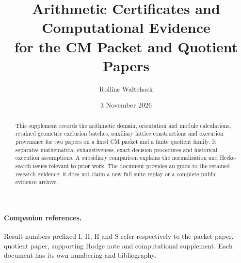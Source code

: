 \documentclass[11pt]{article}
\title{Arithmetic Certificates and Computational Evidence\\for the CM Packet and Quotient Papers}
\author{Rollins Waltchack}
\date{3 November 2026}
\begin{document}
\maketitle
\begin{abstract}
This supplement records the arithmetic domain, orientation and
module calculations, retained geometric exclusion batches, auxiliary
lattice constructions and execution provenance for two papers on a fixed
CM packet and a finite quotient family. It separates mathematical
exhaustiveness, exact decision procedures and historical execution
assumptions. A subsidiary comparison explains the normalization and
Hecke-search issues relevant to prior work. The document provides an
guide to the retained research evidence; it does not claim a
new full-suite replay or a complete public evidence archive.
\end{abstract}
\paragraph{Companion references.}
Result numbers prefixed I, II, H and S refer respectively to the packet
paper, quotient paper, supporting Hodge note and computational supplement.
Each document has its own numbering and bibliography.
{\small\tableofcontents}
\clearpage







\begingroup\small

\endgroup
\end{document}

